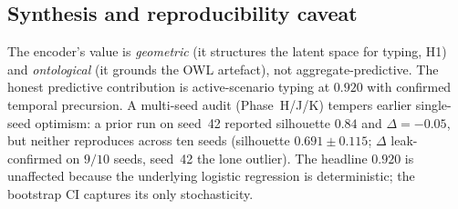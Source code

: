\subsection{Synthesis and reproducibility caveat}
The encoder's value is \emph{geometric} (it structures the latent space for typing, H1) and
\emph{ontological} (it grounds the OWL artefact), not aggregate-predictive. The honest predictive
contribution is active-scenario typing at $0.920$ with confirmed temporal precursion. A multi-seed
audit (Phase~H/J/K) tempers earlier single-seed optimism: a prior run on seed~42 reported
silhouette $0.84$ and $\Delta=-0.05$, but neither reproduces across ten seeds (silhouette
$0.691\pm0.115$; $\Delta$ leak-confirmed on $9/10$ seeds, seed~42 the lone outlier). The headline
$0.920$ is unaffected because the underlying logistic regression is deterministic; the bootstrap CI
captures its only stochasticity.
